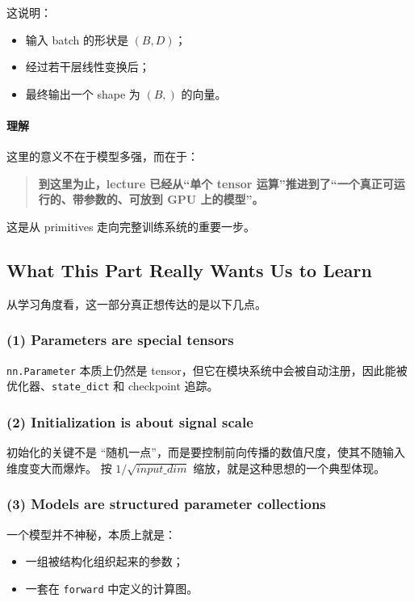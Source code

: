 \documentclass[a4paper,UTF8]{article}
\numberwithin{equation}{section}
\begin{document}
这说明：
\begin{itemize}
    \item 输入 batch 的形状是 \((B,D)\)；
    \item 经过若干层线性变换后；
    \item 最终输出一个 shape 为 \((B,)\) 的向量。
\end{itemize}

\paragraph{理解}
这里的意义不在于模型多强，而在于：

\begin{quote}
\textbf{到这里为止，lecture 已经从“单个 tensor 运算”推进到了“一个真正可运行的、带参数的、可放到 GPU 上的模型”。}
\end{quote}

这是从 primitives 走向完整训练系统的重要一步。

\subsection{What This Part Really Wants Us to Learn}

从学习角度看，这一部分真正想传达的是以下几点。

\subsubsection{(1) Parameters are special tensors}

\verb|nn.Parameter| 本质上仍然是 tensor，但它在模块系统中会被自动注册，因此能被优化器、\verb|state_dict| 和 checkpoint 追踪。

\subsubsection{(2) Initialization is about signal scale}

初始化的关键不是 ``随机一点''，而是要控制前向传播的数值尺度，使其不随输入维度变大而爆炸。  
按 \(1/\sqrt{input\_dim}\) 缩放，就是这种思想的一个典型体现。

\subsubsection{(3) Models are structured parameter collections}

一个模型并不神秘，本质上就是：
\begin{itemize}
    \item 一组被结构化组织起来的参数；
    \item 一套在 \verb|forward| 中定义的计算图。
\end{itemize}
\end{document}
